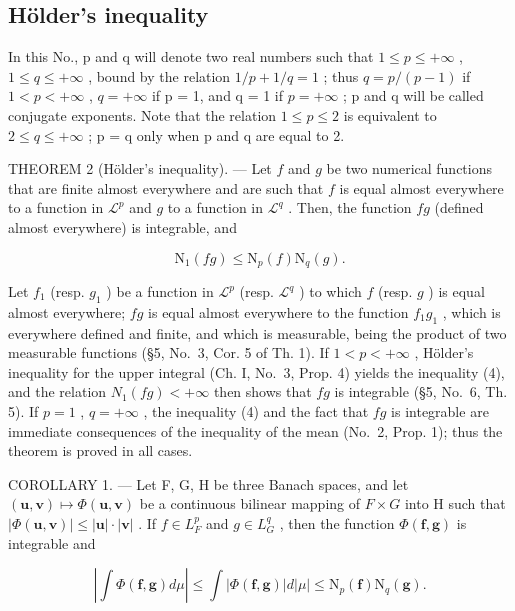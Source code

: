 \subsection{Hölder's inequality}

In this No., p and q will denote two real numbers such that \(1 \leqslant p \leqslant +\infty\) , \(1 \leqslant q \leqslant +\infty\) , bound by the relation \(1/p + 1/q = 1\) ; thus \(q = p/(p - 1)\) if \(1 < p < +\infty\) , \(q = +\infty\) if p = 1, and q = 1 if \(p = +\infty\) ; p and q will be called conjugate exponents. Note that the relation \(1 \leqslant p \leqslant 2\) is equivalent to \(2 \leqslant q \leqslant +\infty\) ; p = q only when p and q are equal to 2.

THEOREM 2 (Hölder's inequality). --- Let \(f\) and \(g\) be two numerical functions that are finite almost everywhere and are such that \(f\) is equal almost everywhere to a function in \(\mathcal{L}^p\) and \(g\) to a function in \(\mathcal{L}^q\) . Then, the function \(fg\) (defined almost everywhere) is integrable, and

\[
\mathrm{N} _ {1} (f g) \leqslant \mathrm{N} _ {p} (f) \mathrm{N} _ {q} (g).\tag{4}
\]

Let \(f_{1}\) (resp. \(g_{1}\) ) be a function in \(\mathcal{L}^{p}\) (resp. \(\mathcal{L}^{q}\) ) to which \(f\) (resp. \(g\) ) is equal almost everywhere; \(fg\) is equal almost everywhere to the function \(f_{1}g_{1}\) , which is everywhere defined and finite, and which is measurable, being the product of two measurable functions (§5, No.~3, Cor. 5 of Th. 1). If \(1 < p < +\infty\) , Hölder's inequality for the upper integral (Ch. I, No.~3, Prop. 4) yields the inequality (4), and the relation \(N_{1}(fg) < +\infty\) then shows that \(fg\) is integrable (§5, No.~6, Th. 5). If \(p = 1\) , \(q = +\infty\) , the inequality (4) and the fact that \(fg\) is integrable are immediate consequences of the inequality of the mean (No.~2, Prop. 1); thus the theorem is proved in all cases.

COROLLARY 1. --- Let F, G, H be three Banach spaces, and let \((\mathbf{u}, \mathbf{v}) \mapsto \Phi(\mathbf{u}, \mathbf{v})\) be a continuous bilinear mapping of \(F \times G\) into H such that \(|\Phi(\mathbf{u}, \mathbf{v})| \leqslant |\mathbf{u}| \cdot |\mathbf{v}|\) . If \(f \in L_{F}^{p}\) and \(g \in L_{G}^{q}\) , then the function \(\Phi(\mathbf{f}, \mathbf{g})\) is integrable and

\[
\left| \int \Phi (\mathbf {f}, \mathbf {g}) d \mu \right| \leqslant \int | \Phi (\mathbf {f}, \mathbf {g}) | d | \mu | \leqslant \mathrm{N} _ {p} (\mathbf {f}) \mathrm{N} _ {q} (\mathbf {g}).\tag{5}
\]

